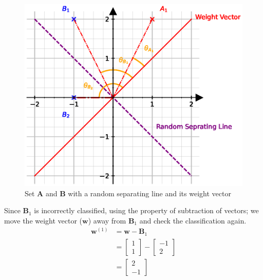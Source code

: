 \begin{figure}[H]
  \centering
  \includegraphics[scale=0.9]{CHAPTER_2/c2_fig_perceptron_example_3_python.eps}
  \caption{Set $\mathbf{A}$ and $\mathbf{B}$ with a random separating line and its weight vector}
  \label{fig:perceptron_example_3}
\end{figure}
\noindent Since $\textbf{B}_1$ is incorrectly classified, using the property of subtraction of vectors; we move the weight vector ($\textbf{w}$) away from $\textbf{B}_1$ and check the classification again.
\begin{align}
  \textbf{w}^{(1)} &= \textbf{w} - \textbf{B}_1 \\
  &= \begin{bmatrix}
    1 \\
    1
  \end{bmatrix} - \begin{bmatrix}
    -1 \\
    2
  \end{bmatrix} \\
  & = \begin{bmatrix}
    2 \\
    -1
  \end{bmatrix}
\end{align}
